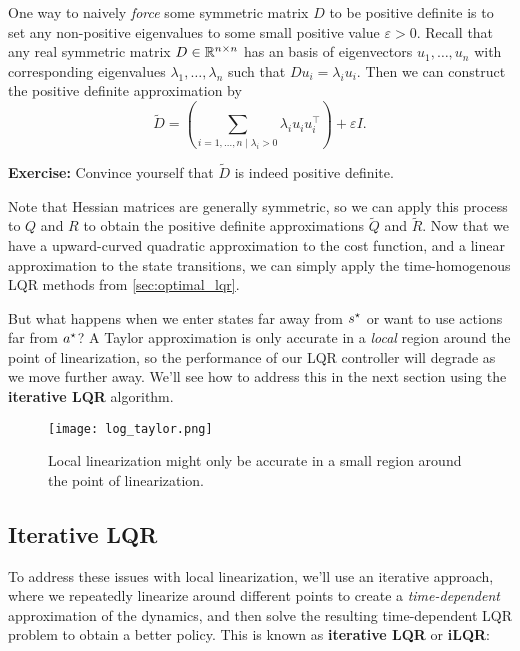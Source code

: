 \documentclass[\main/main]{subfiles}
\begin{document}
One way to naively \emph{force} some symmetric matrix $D$ to be positive definite is to set any non-positive eigenvalues to some small positive value $\varepsilon > 0$.
Recall that any real symmetric matrix $D \in \mathbb{R}^{n \times n}$ has an basis of eigenvectors $u_1, \dots, u_n$ with corresponding eigenvalues $\lambda_1, \dots, \lambda_n$ such that $D u_i = \lambda_i u_i$. Then we can construct the positive definite approximation by \[
    \tilde{D} = \left( \sum_{i=1, \dots, n \mid \lambda_i > 0} \lambda_i u_i u_i^\top \right) + \varepsilon I.
\]

\textbf{Exercise:} Convince yourself that $\tilde{D}$ is indeed positive definite.

Note that Hessian matrices are generally symmetric, so we can apply this process to $Q$ and $R$ to obtain the positive definite approximations $\tilde{Q}$ and $\tilde{R}$. Now that we have a upward-curved quadratic approximation to the cost function, and a linear approximation to the state transitions, we can simply apply the time-homogenous LQR methods from \autoref{sec:optimal_lqr}.


But what happens when we enter states far away from $s^\star$ or want to use actions far from $a^\star$?
A Taylor approximation is only accurate in a \emph{local} region around the point of linearization,
so the performance of our LQR controller will degrade as we move further away.
We'll see how to address this in the next section using the \textbf{iterative LQR} algorithm.
\begin{figure}[h]
    \centering
    \texttt{[image: log\_taylor.png]}
    \caption{Local linearization might only be accurate in a small region around the point of linearization.}
    \label{fig:local_linearization}
\end{figure}

\subsection{Iterative LQR}

To address these issues with local linearization, we'll use an iterative approach, where we repeatedly linearize around different points to create a \emph{time-dependent} approximation of the dynamics, and then solve the resulting time-dependent LQR problem to obtain a better policy.
This is known as \textbf{iterative LQR} or \textbf{iLQR}:
\end{document}
